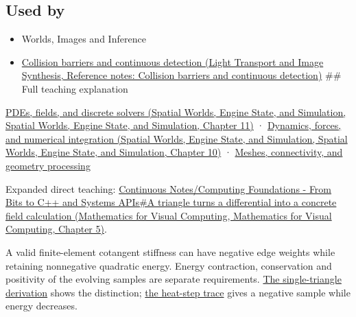\subsection{Used by}\label{appendix-1988d465c119-used-by}

\begin{itemize}
\item
  {Worlds, Images and Inference}
\item
  \href{../04-Light-Transport-and-Image-Synthesis/main.pdf\#nameddest=appendix-a9ba01fa72a6}{Collision barriers and continuous detection (Light Transport and Image Synthesis, Reference notes: Collision barriers and continuous detection)} \#\# Full teaching explanation
\end{itemize}

\href{../05-Spatial-Worlds-Engine-State-and-Simulation/main.pdf\#nameddest=04-visual-computing-ii-ch030-pdes-fields-and-discrete-solvers}{PDEs, fields, and discrete solvers (Spatial Worlds, Engine State, and Simulation, Spatial Worlds, Engine State, and Simulation, Chapter 11)} · \href{../05-Spatial-Worlds-Engine-State-and-Simulation/main.pdf\#nameddest=04-visual-computing-ii-ch029-dynamics-forces-and-numerical-integration}{Dynamics, forces, and numerical integration (Spatial Worlds, Engine State, and Simulation, Spatial Worlds, Engine State, and Simulation, Chapter 10)} · \hyperref[03-visual-computing-i-ch002-meshes-connectivity-and-geometry-processing]{Meshes, connectivity, and geometry processing}

Expanded direct teaching: \href{../02-Mathematics-for-Visual-Computing/main.pdf\#nameddest=02-foundations-ii-ch021-a-triangle-turns-a-differential-into-a-concrete-field-calculation}{Continuous Notes/Computing Foundations - From Bits to C++ and Systems APIs\#A triangle turns a differential into a concrete field calculation (Mathematics for Visual Computing, Mathematics for Visual Computing, Chapter 5)}.

A valid finite-element cotangent stiffness can have negative edge weights while retaining nonnegative quadratic energy. Energy contraction, conservation and positivity of the evolving samples are separate requirements. \hyperref[03-visual-computing-i-ch002-nonnegative-energy-and-nonnegative-weights-are-different-promises]{The single-triangle derivation} shows the distinction; \hyperref[03-visual-computing-i-ch002-a-stable-heat-step-can-still-create-a-negative-sample]{the heat-step trace} gives a negative sample while energy decreases.
